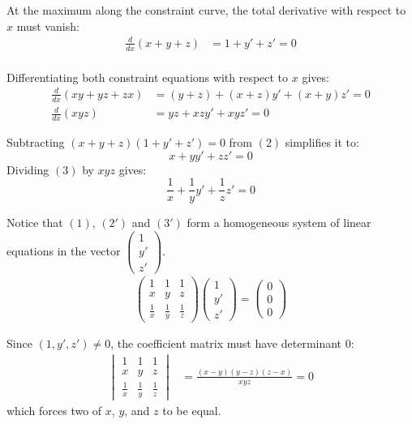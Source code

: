 \begin{enumerate}
 At the maximum along the constraint curve, the total derivative with respect to $x$ must vanish:\begin{align*}\frac{d}{dx}(x+y+z) &= 1 + y' + z' = 0 \tag{1}\\\end{align*}


 Differentiating both constraint equations with respect to $x$ gives:\begin{align}\frac{d}{dx}(xy+yz+zx) &= (y+z) + (x+z)y' + (x+y)z' = 0 \tag{2} \\\frac{d}{dx}(xyz) &= yz + xz y' + xy z' = 0 \tag{3}\end{align}

 Subtracting $(x+y+z)(1 + y' + z') = 0$ from $(2)$ simplifies it to:
 \[x + y y' + z z' = 0 \tag{2'}\]Dividing $(3)$ by $xyz$ gives:
 \[\frac{1}{x} + \frac{1}{y}y' + \frac{1}{z}z' = 0 \tag{3'}\]

 Notice that $(1)$, $(2')$ and $(3')$ form a homogeneous system of linear equations in the vector $\begin{pmatrix} 1 \\ y' \\ z' \end{pmatrix}$. \begin{align*}\begin{pmatrix} 1 & 1 & 1 \\ x & y & z \\ \frac{1}{x} & \frac{1}{y} & \frac{1}{z} \end{pmatrix} \begin{pmatrix} 1 \\ y' \\ z' \end{pmatrix} = \begin{pmatrix} 0 \\ 0 \\ 0 \end{pmatrix}\end{align*}


 Since $(1, y', z') \neq 0$, the coefficient matrix must have determinant $0$:\begin{align*}\begin{vmatrix}1 & 1 & 1 \\x & y & z \\\frac{1}{x} & \frac{1}{y} & \frac{1}{z}\end{vmatrix}&= \frac{(x-y)(y-z)(z-x)}{xyz} = 0\end{align*}
which forces two of $x$, $y$, and $z$ to be equal.


\end{enumerate}
